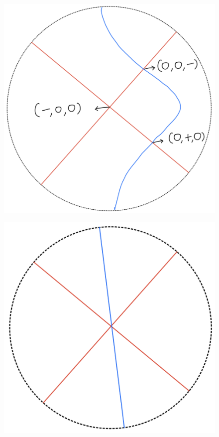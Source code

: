 \begin{definition}
\begin{enumerate}
\begin{itemize}
\begin{figure}[H]
    \centering
    \includegraphics[scale = 0.95]{diagrams/lemma4/13.png}
    \caption{}
    \label{fig:your-label}
\end{figure}
\begin{figure}[H]
    \centering
    \includegraphics[scale = 0.95]{diagrams/lemma4/14.png}

\end{figure}
\end{itemize}
\end{enumerate}
\end{definition}
